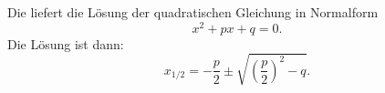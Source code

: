 Die  liefert die Lösung der quadratischen Gleichung in Normalform
$$x^2+px+q=0.$$
Die Lösung ist dann:
$$x_{1/2} = -\frac{p}{2} \pm \sqrt{\left(\frac{p}{2}\right)^2-q}.$$